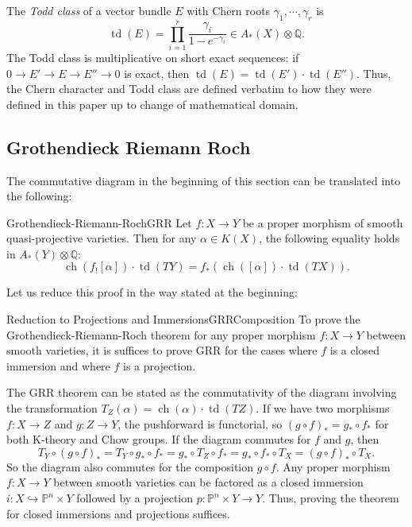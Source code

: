 \documentclass{book}
\newenvironment{Proof}[1][]
  {\begin{ProofTcb}[#1]}
  {\end{ProofTcb}}
\newcommand{\Q}{{\mathbb{Q}}}
\renewcommand{\P}{{\mathbb{P}}}
\newcommand{\ch}{{\operatorname{ch}}}
\newcommand{\td}{{\operatorname{td}}}
\renewcommand{\ch}{{\operatorname{ch}}}
\begin{document}
The \emph{Todd class} of a vector bundle $E$ with Chern roots $\gamma_1, \cdots, \gamma_r$ is \[ \td(E) =
\prod_{i=1}^r \frac{\gamma_i}{1 - e^{-\gamma_i}} \in A_*(X) \otimes \Q. \] The Todd class is multiplicative on
short exact sequences: if $0 \to E' \to E \to E'' \to 0$ is exact, then $\td(E) = \td(E') \cdot \td(E'')$.
Thus, the Chern character and Todd class are defined verbatim to how they were defined in this paper up to
change of mathematical domain.

\subsection*{Grothendieck Riemann Roch}

The commutative diagram in the beginning of this section can be translated into the following:

\begin{thm}{Grothendieck-Riemann-Roch}{GRR}
    Let $f: X \to Y$ be a proper morphism of smooth quasi-projective varieties. Then for any $\alpha \in
    K(X)$, the following equality holds in $A_*(Y) \otimes \Q$:
    \[
      \ch(f_! [\alpha]) \cdot \td(TY) = f_*(\ch([\alpha]) \cdot \td(TX)).
    \]
\end{thm}

Let us reduce this proof in the way stated at the beginning:

\begin{prop}{Reduction to Projections and Immersions}{GRRComposition}
    To prove the Grothendieck-Riemann-Roch theorem for any proper morphism $f: X \to Y$ between smooth
    varieties, it is suffices to prove GRR for the cases where $f$ is a closed immersion and where $f$ is a projection.
\end{prop}
\begin{Proof}
    The GRR theorem can be stated as the commutativity of the diagram involving the transformation $T_Z(\alpha) = \ch(\alpha) \cdot \td(TZ)$. If we have two morphisms $f: X \to Z$ and $g: Z \to Y$, the pushforward is functorial, so $(g \circ f)_* = g_* \circ f_*$ for both K-theory and Chow groups. If the diagram commutes for $f$ and $g$, then
    \[ T_Y \circ (g \circ f)_* = T_Y \circ g_* \circ f_* = g_* \circ T_Z \circ f_* = g_* \circ f_* \circ T_X = (g \circ f)_* \circ T_X. \]
    So the diagram also commutes for the composition $g \circ f$. Any proper morphism $f: X \to Y$ between smooth varieties can be factored as a closed immersion $i: X \hookrightarrow \P^n \times Y$ followed by a projection $p: \P^n \times Y \to Y$. Thus, proving the theorem for closed immersions and projections suffices.
\end{Proof}
\end{document}
